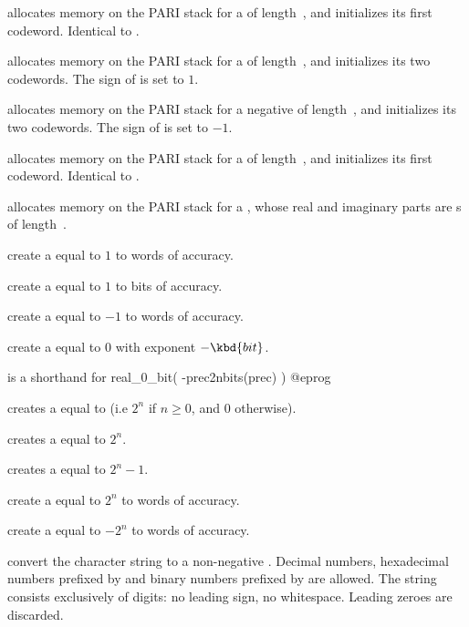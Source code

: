 
 allocates memory on the PARI stack for a 
of length~, and initializes its first codeword. Identical to
.

 allocates memory on the PARI stack for a
 of length~, and initializes its two codewords. The sign
of  is set to $1$.

 allocates memory on the PARI stack for a negative
 of length~, and initializes its two codewords. The sign
of  is set to $-1$.

 allocates memory on the PARI stack for a 
of length~, and initializes its first codeword. Identical to
.

 allocates memory on the PARI stack for a
, whose real and imaginary parts are s
of length~.

 create a  equal to $1$ to 
words of accuracy.

 create a  equal to $1$ to
 bits of accuracy.

 create a  equal to $-1$ to 
words of accuracy.

 create a  equal to $0$ with
exponent $-\kbd{bit}$.

 is a shorthand for
\bprog
  real_0_bit( -prec2nbits(prec) )
@eprog

 creates a  equal to  (i.e
$2^n$ if $n \geq 0$, and $0$ otherwise).

 creates a  equal to $2^n$.

 creates a  equal to $2^n - 1$.

 create a  equal to $2^n$
to  words of accuracy.

 create a  equal to $-2^n$
to  words of accuracy.

 convert the character string  to a
non-negative .
Decimal numbers, hexadecimal numbers prefixed by  and binary numbers prefixed
by  are allowed.  The string  consists exclusively of digits:
no leading sign, no whitespace. Leading zeroes are discarded.

